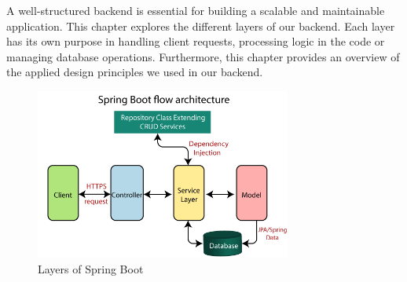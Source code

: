 \Author{\daAuthorThree}

    A well-structured backend is essential for building a scalable and maintainable application. This chapter explores the different layers of our backend. Each layer has its own purpose in handling client requests, processing logic in the code or managing database operations. Furthermore, this chapter provides an overview of the applied design principles we used in our backend.

    \begin{figure} [H]
        \centering
        \includegraphics [width=0.75\textwidth] {images/andreas/backendstructure/springBootLayers.png}
        \caption{Layers of Spring Boot \autocite{Andi:SpringLayersPic}}
        
    \end{figure}

